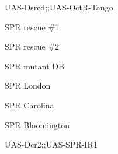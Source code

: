 \documentclass[17pt]{extarticle}
\begin{document}
\footnotesize
\vspace*{\fill}
\newpage{}
\vspace*{\fill}\begin{footnotesize}
UAS-Dsred;;UAS-OctR-Tango \\[0.5em]
\end{footnotesize}
\footnotesize
\vspace*{\fill}
\newpage{}
\vspace*{\fill}\begin{normalsize}
SPR rescue \#1 \\[0.5em]
\end{normalsize}
\footnotesize
\vspace*{\fill}
\newpage{}
\vspace*{\fill}\begin{normalsize}
SPR rescue \#2 \\[0.5em]
\end{normalsize}
\footnotesize
\vspace*{\fill}
\newpage{}
\vspace*{\fill}\begin{normalsize}
SPR mutant DB \\[0.5em]
\end{normalsize}
\footnotesize
\vspace*{\fill}
\newpage{}
\vspace*{\fill}\begin{large}
SPR London \\[0.5em]
\end{large}
\footnotesize
\vspace*{\fill}
\newpage{}
\vspace*{\fill}\begin{normalsize}
SPR Carolina \\[0.5em]
\end{normalsize}
\footnotesize
\vspace*{\fill}
\newpage{}
\vspace*{\fill}\begin{normalsize}
SPR Bloomington \\[0.5em]
\end{normalsize}
\footnotesize
\vspace*{\fill}
\newpage{}
\vspace*{\fill}\begin{footnotesize}
UAS-Dcr2;;UAS-SPR-IR1 \\[0.5em]
\end{footnotesize}
\end{document}
